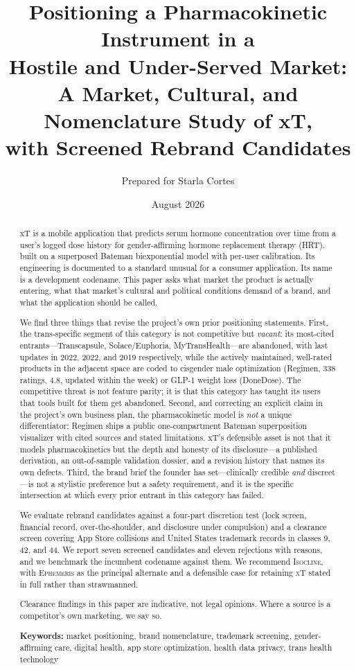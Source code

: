 \documentclass[11pt,a4paper]{article}
\title{\textbf{Positioning a Pharmacokinetic Instrument in a\\
Hostile and Under-Served Market:}\\[0.3em]
\large A Market, Cultural, and Nomenclature Study of xT,\\
with Screened Rebrand Candidates}
\author{Prepared for Starla Cortes}
\date{August 2026}
\newcommand{\name}[1]{\textsc{#1}}
\begin{document}
\maketitle

\begin{abstract}
\noindent
xT is a mobile application that predicts serum hormone concentration
over time from a user's logged dose history for gender-affirming
hormone replacement therapy (HRT), built on a superposed Bateman
biexponential model with per-user calibration. Its engineering is
documented to a standard unusual for a consumer application. Its name
is a development codename. This paper asks what market the product is
actually entering, what that market's cultural and political conditions
demand of a brand, and what the application should be called.

We find three things that revise the project's own prior positioning
statements. First, the trans-specific segment of this category is not
competitive but \emph{vacant}: its most-cited entrants---Transcapsule,
Solace/Euphoria, MyTransHealth---are abandoned, with last updates in
2022, 2022, and 2019 respectively, while the actively maintained,
well-rated products in the adjacent space are coded to
cisgender male optimization (Regimen, 338 ratings, 4.8, updated within
the week) or GLP-1 weight loss (DoneDose). The competitive threat is
not feature parity; it is that this category has taught its users that
tools built for them get abandoned. Second, and correcting an explicit
claim in the project's own business plan, the pharmacokinetic model is
\emph{not} a unique differentiator: Regimen ships a public one-compartment
Bateman superposition visualizer with cited sources and stated
limitations. xT's defensible asset is not that it models
pharmacokinetics but the depth and honesty of its disclosure---a
published derivation, an out-of-sample validation dossier, and a
revision history that names its own defects. Third, the brand brief the
founder has set---clinically credible \emph{and} discreet---is not a
stylistic preference but a safety requirement, and it is the specific
intersection at which every prior entrant in this category has failed.

We evaluate rebrand candidates against a four-part discretion test
(lock screen, financial record, over-the-shoulder, and disclosure under
compulsion) and a clearance screen covering App Store collisions and
United States trademark records in classes 9, 42, and 44. We report
seven screened candidates and eleven rejections with reasons, and we
benchmark the incumbent codename against them. We recommend
\name{Isocline}, with \name{Ephemeris} as the principal alternate and a
defensible case for retaining \name{xT} stated in full rather than
strawmanned.

Clearance findings in this paper are indicative, not legal opinions.
Where a source is a competitor's own marketing, we say so.

\textbf{Keywords:} market positioning, brand nomenclature, trademark
screening, gender-affirming care, digital health, app store
optimization, health data privacy, trans health technology
\end{abstract}
\end{document}

